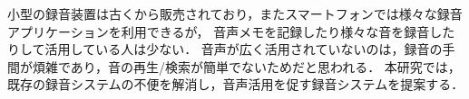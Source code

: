 \begin{jabstract}
小型の録音装置は古くから販売されており，またスマートフォンでは様々な録音アプリケーションを利用できるが，
音声メモを記録したり様々な音を録音したりして活用している人は少ない．
音声が広く活用されていないのは，録音の手間が煩雑であり，音の再生/検索が簡単でないためだと思われる．
本研究では，既存の録音システムの不便を解消し，音声活用を促す録音システムを提案する．
\end{jabstract}
